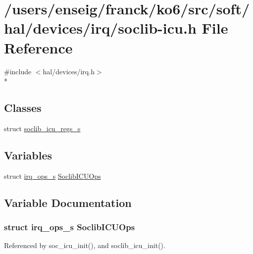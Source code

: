 \hypertarget{irq_2soclib-icu_8h}{\section{/users/enseig/franck/ko6/src/soft/hal/devices/irq/soclib-\/icu.h File Reference}
\label{irq_2soclib-icu_8h}
}
{\ttfamily \#include $<$hal/devices/irq.\-h$>$}\\*
\subsection*{Classes}
\begin{DoxyCompactItemize}
\item 
struct \hyperlink{structsoclib__icu__regs__s}{soclib\-\_\-icu\-\_\-regs\-\_\-s}
\end{DoxyCompactItemize}
\subsection*{Variables}
\begin{DoxyCompactItemize}
\item 
struct \hyperlink{structirq__ops__s}{irq\-\_\-ops\-\_\-s} \hyperlink{irq_2soclib-icu_8h_afb40570f9a309b6ec805f02ea8e2a990}{Soclib\-I\-C\-U\-Ops}
\end{DoxyCompactItemize}


\subsection{Variable Documentation}
\hypertarget{irq_2soclib-icu_8h_afb40570f9a309b6ec805f02ea8e2a990}{
\subsubsection[{Soclib\-I\-C\-U\-Ops}]{\setlength{\rightskip}{0pt plus 5cm}struct {\bf irq\-\_\-ops\-\_\-s} Soclib\-I\-C\-U\-Ops}}\label{irq_2soclib-icu_8h_afb40570f9a309b6ec805f02ea8e2a990}


Referenced by soc\-\_\-icu\-\_\-init(), and soclib\-\_\-icu\-\_\-init().

